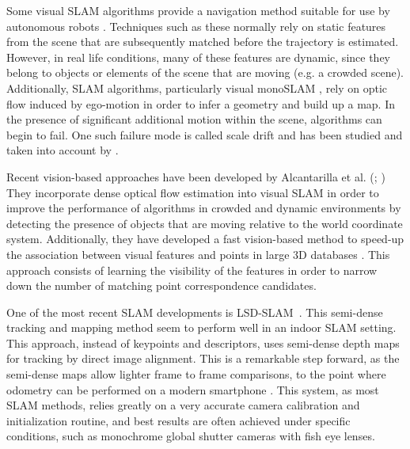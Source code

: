 Some visual SLAM algorithms provide a navigation method suitable for use by autonomous robots \citep{konolige2007frame}. Techniques such as these normally rely on static features from the scene that are subsequently matched before the trajectory is estimated. However, in real life conditions, many of these features are dynamic, since they belong to objects or elements of the scene that are moving (e.g. a crowded scene). Additionally, SLAM algorithms, particularly visual monoSLAM \citep{davison2007monoslam}, rely on optic flow induced by ego-motion in order to infer a geometry and build up a map. In the presence of significant additional motion within the scene, algorithms can begin to fail.  One such failure mode is called scale drift and has been studied and taken into account by \cite{strasdat2010scale}. 

Recent vision-based approaches have been developed by Alcantarilla et al. (\citeyear{alcantarilla2010visual}; \citeyear{alcantarilla2012combining}) They incorporate dense optical flow estimation into visual SLAM in order to improve the performance of algorithms in crowded and dynamic environments by detecting the presence of objects that are moving relative to the world coordinate system. Additionally, they have developed a fast vision-based method to speed-up the association between visual features and points in large 3D databases \citep{alcantarilla2010learning}. This approach consists of learning the visibility of the features in order to narrow down the number of matching point correspondence candidates.

One of the most recent SLAM developments is LSD-SLAM~\citep{engel14eccv}. This semi-dense tracking and mapping method seem to perform well in an indoor SLAM setting. This approach, instead of keypoints and descriptors, uses semi-dense depth maps for tracking by direct image alignment. This is a remarkable step forward, as the semi-dense maps allow lighter frame to frame comparisons, to the point where odometry can be performed on a modern smartphone \citep{schoeps14ismar}. This system, as most SLAM methods, relies greatly on a very accurate camera calibration and initialization routine, and best results are often achieved under specific conditions, such as monochrome global shutter cameras with fish eye lenses.

